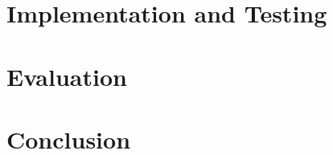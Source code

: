 \Blindtext[2][2]

\section{Implementation and Testing}
\label{sec:system:imptest}


\section{Evaluation}
\label{sec:system:evaluation}




\Blindtext[4][2]

\section{Conclusion}
\label{sec:system:conclusion}

\Blindtext[2][1]
